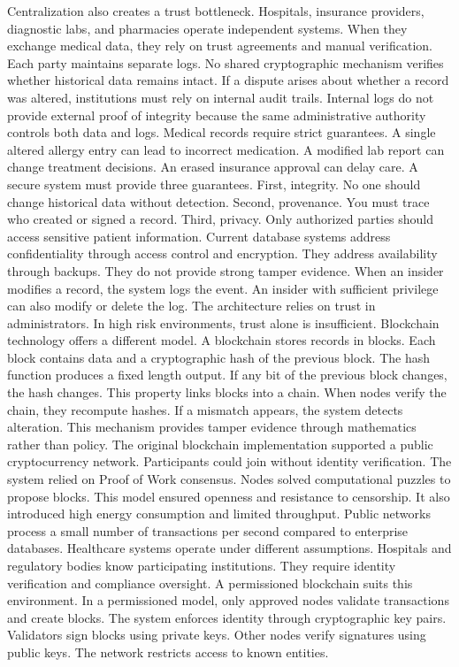 Centralization also creates a trust bottleneck. Hospitals, insurance providers, diagnostic labs, and pharmacies operate independent systems. When they exchange medical data, they rely on trust agreements and manual verification. Each party maintains separate logs. No shared cryptographic mechanism verifies whether historical data remains intact. If a dispute arises about whether a record was altered, institutions must rely on internal audit trails. Internal logs do not provide external proof of integrity because the same administrative authority controls both data and logs.
Medical records require strict guarantees. A single altered allergy entry can lead to incorrect medication. A modified lab report can change treatment decisions. An erased insurance approval can delay care. A secure system must provide three guarantees. First, integrity. No one should change historical data without detection. Second, provenance. You must trace who created or signed a record. Third, privacy. Only authorized parties should access sensitive patient information.
Current database systems address confidentiality through access control and encryption. They address availability through backups. They do not provide strong tamper evidence. When an insider modifies a record, the system logs the event. An insider with sufficient privilege can also modify or delete the log. The architecture relies on trust in administrators. In high risk environments, trust alone is insufficient.
Blockchain technology offers a different model. A blockchain stores records in blocks. Each block contains data and a cryptographic hash of the previous block. The hash function produces a fixed length output. If any bit of the previous block changes, the hash changes. This property links blocks into a chain. When nodes verify the chain, they recompute hashes. If a mismatch appears, the system detects alteration. This mechanism provides tamper evidence through mathematics rather than policy.
The original blockchain implementation supported a public cryptocurrency network. Participants could join without identity verification. The system relied on Proof of Work consensus. Nodes solved computational puzzles to propose blocks. This model ensured openness and resistance to censorship. It also introduced high energy consumption and limited throughput. Public networks process a small number of transactions per second compared to enterprise databases.
Healthcare systems operate under different assumptions. Hospitals and regulatory bodies know participating institutions. They require identity verification and compliance oversight. A permissioned blockchain suits this environment. In a permissioned model, only approved nodes validate transactions and create blocks. The system enforces identity through cryptographic key pairs. Validators sign blocks using private keys. Other nodes verify signatures using public keys. The network restricts access to known entities.
